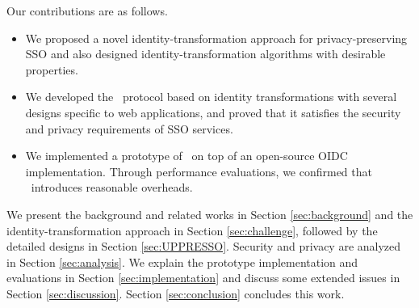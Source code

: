 Our contributions are as follows.
\vspace{-\topsep}
\begin{itemize}
\setlength{\topsep}{0pt}
\setlength{\partopsep}{0pt}
\setlength{\itemsep}{0pt}
\setlength{\parsep}{0pt}
\setlength{\parskip}{0pt}
\item We proposed a novel identity-transformation approach for privacy-preserving SSO and also designed identity-transformation algorithms with desirable properties.
\item We developed the \usso\ protocol based on identity transformations with several designs specific to web applications, and proved that it satisfies the security and privacy requirements of SSO services.
\item We implemented a prototype of \usso\ on top of an open-source OIDC implementation. Through performance evaluations, we confirmed that \usso\ introduces reasonable overheads.
\end{itemize}


We present the background and related works in Section \ref{sec:background} and the identity-transformation approach in Section \ref{sec:challenge}, followed by the detailed designs in Section \ref{sec:UPPRESSO}.
Security and privacy are analyzed in Section \ref{sec:analysis}.
We explain the prototype implementation and evaluations in Section \ref{sec:implementation} and discuss some extended issues in Section \ref{sec:discussion}. Section \ref{sec:conclusion} concludes this work.
